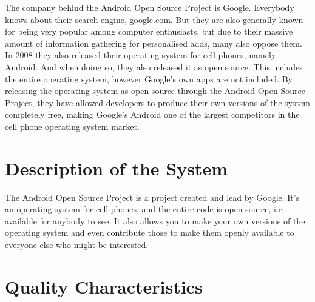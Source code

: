 \documentclass[conference]{IEEEtran}
\begin{document}

The company behind the Android Open Source Project is Google. Everybody knows about their search engine, google.com. But they are also generally known for being very popular among computer enthusiasts, but due to their massive amount of information gathering for personalised adds, many also oppose them. In 2008 they also released their operating system for cell phones, namely Android.\cite{android-release} And when doing so, they also released it as open source. This includes the entire operating system, however Google's own apps are not included. By releasing the operating system as open source through the Android Open Source Project, they have allowed developers to produce their own versions of the system completely free, making Google's Android one of the largest competitors in the cell phone operating system market.\cite{android-market}


\section{Description of the System}
\label{system}

The Android Open Source Project is a project created and lead by Google. It's an operating system for cell phones, and the entire code is open source, i.e. available for anybody to see. It also allows you to make your own versions of the operating system and even contribute those to make them openly available to everyone else who might be interested.


\section{Quality Characteristics}
\label{quality}
\end{document}
